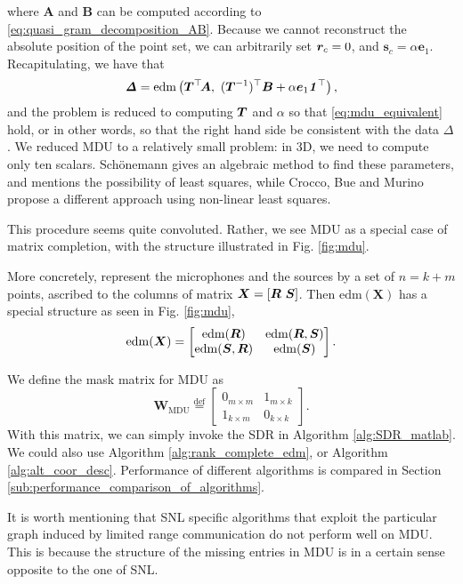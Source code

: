 \documentclass[10pt,double]{IEEEtran}
\providecommand{\bydef}{\overset{\text{def}}{=}}
\renewcommand{\vec}[1]{\ensuremath{\boldsymbol{#1}}}
\providecommand{\mat}[1]{\ensuremath{\boldsymbol{#1}}}
\providecommand{\mA}{\mat{A}} \providecommand{\mB}{\mat{B}}
\providecommand{\mS}{\mat{S}} \providecommand{\mU}{\mat{U}}
\providecommand{\mW}{\mat{W}}
\providecommand{\mX}{\mat{X}}\providecommand{\mY}{\mat{Y}}
\providecommand{\ve}{\vec{e}} \providecommand{\vf}{\vec{f}}
\providecommand{\vs}{\vec{s}}
\newcommand{\EDM}{\ensuremath{\mathrm{edm}}}
\newcommand{\vone}{\ensuremath{\vec{\mathit{1}}}}
\renewcommand{\vzero}{\ensuremath{\vec{\mathit{0}}}}
\newcommand{\T}{\ensuremath{\top}}
\newcommand{\mDelta}{\bm{\mathit{\Delta}}}
\begin{document}
where $\mA$ and $\mB$ can be computed according to
\eqref{eq:quasi_gram_decomposition_AB}. Because we cannot reconstruct the
absolute position of the point set, we can arbitrarily set $\vr_c = 0$, and
$\vs_c = \alpha \ve_1$. Recapitulating, we have that
\begin{equation}
	\label{eq:mdu_equivalent}
	\mDelta = \EDM\left(\mT^\T \! \mA, \ (\mT^{-1})^\T \mB + \alpha \ve_1 \vone^\T\right),
\end{equation}
and the problem is reduced to computing $\mT$ and $\alpha$ so that
\eqref{eq:mdu_equivalent} hold, or in other words, so that the right hand
side be consistent with the data $\mDelta$. We reduced MDU to a relatively
small problem: in 3D, we need to compute only ten scalars. Sch\"onemann
\cite{Schonemann:1970wd} gives an algebraic method to find these parameters,
and mentions the possibility of least squares, while Crocco, Bue and Murino
\cite{Crocco:2012eu} propose a different approach using non-linear least
squares.


This procedure seems quite convoluted. Rather, we see MDU as a special case of
matrix completion, with the structure illustrated in Fig.
\ref{fig:mdu}.

More concretely, represent the microphones and the sources by a set of $n =
k+m$ points, ascribed to the columns of matrix $\mX = [\mR \ \mS]$. Then
$\EDM(\mX)$ has a special structure as seen in Fig. \ref{fig:mdu},
\begin{equation}
	\EDM(\mX) = 
	\begin{bmatrix}
		\EDM(\mR) & \EDM(\mR, \mS) \\
		\EDM(\mS, \mR) & \EDM(\mS)
	\end{bmatrix}.
\end{equation}

We define the mask matrix for MDU as
\begin{equation}
	\mW_{\text{MDU}} \bydef
	\begin{bmatrix}
	    \vzero_{m \times m} & \vone_{m \times k} \\
	    \vone_{k \times m} & \vzero_{k \times k}
	\end{bmatrix}.
\end{equation}
With this matrix, we can simply invoke the SDR in Algorithm
\ref{alg:SDR_matlab}. We could also use Algorithm
\ref{alg:rank_complete_edm}, or Algorithm \ref{alg:alt_coor_desc}. Performance
of different algorithms is compared in Section
\ref{sub:performance_comparison_of_algorithms}.


It is worth mentioning that SNL specific algorithms that exploit the
particular graph induced by limited range communication do not perform well on
MDU. This is because the structure of the missing entries in MDU is in a
certain sense opposite to the one of SNL. 
\end{document}
